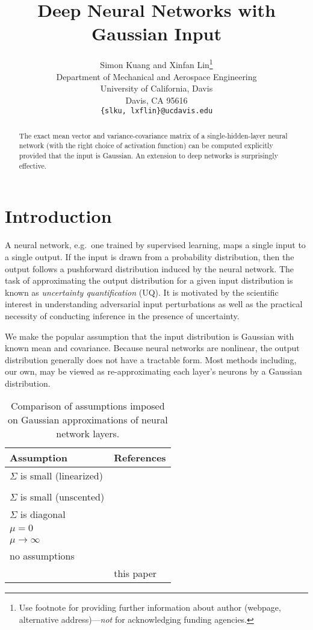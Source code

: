 \documentclass{article}
\title{Deep Neural Networks with Gaussian Input}
\author{%
  Simon Kuang and Xinfan Lin\thanks{\color{red} Use footnote for providing further information
    about author (webpage, alternative address)---\emph{not} for acknowledging
    funding agencies.} \\
  Department of Mechanical and Aerospace Engineering\\
  University of California, Davis\\
  Davis, CA 95616 \\
  \texttt{\{slku, lxflin\}@ucdavis.edu} \\
}
\begin{document}
\maketitle


\begin{abstract}
    The exact mean vector and variance-covariance matrix of a single-hidden-layer neural network (with the right choice of activation function) can be computed explicitly provided that the input is Gaussian.
    An extension to deep networks is surprisingly effective.
\end{abstract}

\section{Introduction}
A neural network, e.g.~one trained by supervised learning, maps a single input to a single output.
If the input is drawn from a probability distribution, then the output follows a pushforward distribution induced by the neural network.
The task of approximating the output distribution for a given input distribution is known as \emph{uncertainty quantification} (UQ).
It is motivated by the scientific interest in understanding adversarial input perturbations as well as the practical necessity of conducting inference in the presence of uncertainty.

We make the popular assumption that the input distribution is Gaussian with known mean and covariance.
Because neural networks are nonlinear, the output distribution generally does not have a tractable form.
Most methods including, our own, may be viewed as re-approximating each layer's neurons by a Gaussian distribution.

\begin{table}[h]
    \begin{center}
      \begin{tabular}{ll}
      \toprule
      Assumption & References \\
      \midrule
      \(\Sigma\) is small (linearized)  & \citet{titensky_uncertainty_2018, nagel_kalman-bucy-informed_2022}\\
      & \citet{petersen_uncertainty_2024, jungmann_analytical_2025} \\
      \(\Sigma\) is small (unscented) & \citet{astudillo_propagation_2011, abdelaziz_uncertainty_2015} \\
      \(\Sigma\) is diagonal          &  \citet{huber_bayesian_2020, wagner_kalman_2022,akgul_deterministic_2025}\\
      \(\mu = 0\)    & \citet{bibi_analytic_2018} \\
      \(\mu \to \infty\) & \citet{wu_deterministic_2019} \\
      no assumptions                 &  \citet{wright_analytic_2024}\\
      & this paper \\
      \bottomrule
      \end{tabular}
    \end{center}
    
    \caption{\label{tab:covariance-assumptions} Comparison of assumptions imposed on Gaussian approximations of neural network layers.}
\end{table}
\end{document}
